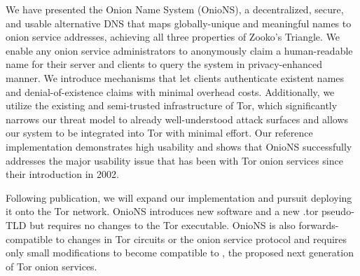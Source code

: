 \documentclass[USenglish,oneside,twocolumn]{article}
\begin{document}
We have presented the Onion Name System (OnioNS), a decentralized, secure, and usable alternative DNS that maps globally-unique and meaningful names to onion service addresses, achieving all three properties of Zooko's Triangle. We enable any onion service administrators to anonymously claim a human-readable name for their server and clients to query the system in privacy-enhanced manner. We introduce mechanisms that let clients authenticate existent names and denial-of-existence claims with minimal overhead costs. Additionally, we utilize the existing and semi-trusted infrastructure of Tor, which significantly narrows our threat model to already well-understood attack surfaces and allows our system to be integrated into Tor with minimal effort. Our reference implementation demonstrates high usability and shows that OnioNS successfully addresses the major usability issue that has been with Tor onion services since their introduction in 2002.

Following publication, we will expand our implementation and pursuit deploying it onto the Tor network. OnioNS introduces new software and a new .tor pseudo-TLD but requires no changes to the Tor executable. OnioNS is also forwards-compatible to changes in Tor circuits or the onion service protocol and requires only small modifications to become compatible to \cite{TorProp224}, the proposed next generation of Tor onion services.



\end{document}
